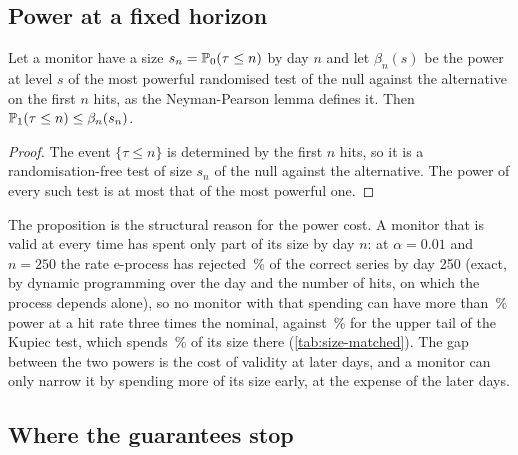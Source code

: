 \subsection{Power at a fixed horizon}
\label{sec:theory-power}

\begin{proposition}
\label{prop:power}
Let a monitor have a size $s_n=\mathbb{P}_0(\tau\le n)$ by day $n$ and let $\beta_n(s)$ be the power at level $s$ of the most powerful randomised test of the null against the alternative on the first $n$ hits, as the Neyman-Pearson lemma defines it. Then $\mathbb{P}_1(\tau\le n)\le\beta_n(s_n)$.
\end{proposition}
\begin{proof}
The event $\{\tau\le n\}$ is determined by the first $n$ hits, so it is a randomisation-free test of size $s_n$ of the null against the alternative. The power of every such test is at most that of the most powerful one.
\end{proof}

The proposition is the structural reason for the power cost. A monitor that is valid at every time has spent only part of its size by day $n$: at $\alpha=0.01$ and $n=250$ the rate e-process has rejected \nExactESize\,\% of the correct series by day 250 (exact, by dynamic programming over the day and the number of hits, on which the process depends alone), so no monitor with that spending can have more than \nExactThreeNpE\,\% power at a hit rate three times the nominal, against
\nExactThreeKupUp\,\% for the upper tail of the Kupiec test, which spends \nExactKupUpperSize\,\% of its size there (\cref{tab:size-matched}). The gap between the two powers is the cost of validity at later days, and a monitor can only narrow it by spending more of its size early, at the expense of the later days.

\subsection{Where the guarantees stop}
\label{sec:theory-failure}

